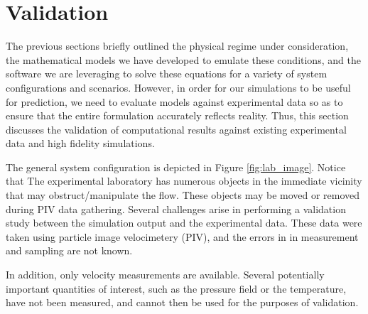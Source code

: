 
\section{Validation}
\label{sec:validation}

%
%

The previous sections briefly outlined the physical regime under
consideration, the mathematical models we have developed to emulate
these conditions, and the software we are leveraging to solve these
equations for a variety of system configurations and scenarios. 
However, in order for our simulations to be useful for prediction, we
need to evaluate models against experimental data so
as to ensure that the entire formulation accurately reflects reality. 
Thus, this section discusses the validation of computational results
against existing experimental data and high fidelity simulations.

%
%

The general system configuration is depicted
in Figure \ref{fig:lab_image}. 
Notice that The experimental laboratory has numerous objects
in the immediate vicinity that may
obstruct/manipulate the flow. These objects may be moved or removed
during PIV data gathering. 
Several challenges arise in performing a validation study between the
simulation output and the experimental data. These data were taken using
particle image velocimetery (PIV), and the errors in 
in measurement and sampling are not known. 



In addition, only velocity measurements are available. Several
potentially important quantities of interest, such as the pressure field
or the temperature, have not been measured, and cannot then be used for
the purposes of validation. 


%
%
%
% 
%
%


